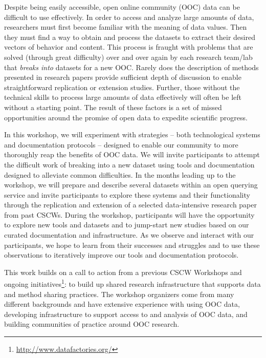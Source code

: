 Despite being easily accessible, open online community (OOC) data can be difficult to use effectively.  In order to access and analyze large amounts of data, researchers must first become familiar with the meaning of data values.  Then they must find a way to obtain and process the datasets to extract their desired vectors of behavior and content.  This process is fraught with problems that are solved (through great difficulty) over and over again by each research team/lab that \emph{breaks into} datasets for a new OOC.  Rarely does the description of methods presented in research papers provide sufficient depth of discussion to enable straightforward replication or extension studies.  Further, those without the technical skills to process large amounts of data effectively will often be left without a starting point.  The result of these factors is a set of missed opportunities around the promise of open data to expedite scientific progress.

In this workshop, we will experiment with strategies -- both technological systems and documentation protocols -- designed to enable our community to more thoroughly reap the benefits of OOC data.  We will invite participants to attempt the difficult work of breaking into a new dataset using tools and documentation designed to alleviate common difficulties.  In the months leading up to the workshop, we will prepare and describe several datasets within an open querying service and invite participants to explore these systems and their functionality through the replication and extension of a selected data-intensive research paper from past CSCWs.  During the workshop, participants will have the opportunity to explore new tools and datasets and to jump-start new studies based on our curated documentation and infrastructure. As we observe and interact with our participants, we hope to learn from their successes and struggles and to use these observations to iteratively improve our tools and documentation protocols.

This work builds on a call to action from a previous CSCW Workshops\cite{goggins14ocdata, morgan15advancing} and ongoing initiatives\footnote{\url{http://www.datafactories.org/}}: to build up shared research infrastructure\cite{wiggins14quality, morgan15advancing_report} that supports data and method sharing practices. The workshop organizers come from many different backgrounds and have extensive experience with using OOC data, developing infrastructure to support access to and analysis of OOC data, and building communities of practice around OOC research.

